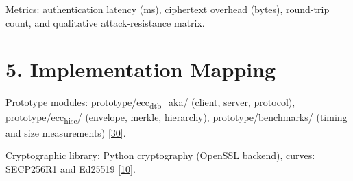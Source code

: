 \indent Metrics: authentication latency (ms), ciphertext overhead (bytes), round-trip count, and qualitative attack-resistance matrix.

\section{5. Implementation Mapping}

\indent Prototype modules: prototype/ecc\textsubscript{dtb}\_aka/ (client, server, protocol), prototype/ecc\textsubscript{hise}/ (envelope, merkle, hierarchy), prototype/benchmarks/ (timing and size measurements) \hyperref[ref:30]{[30]}.

\indent Cryptographic library: Python cryptography (OpenSSL backend), curves: SECP256R1 and Ed25519 \hyperref[ref:10]{[10]}.

